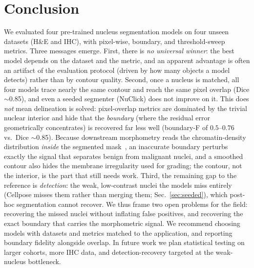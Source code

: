 \documentclass[10pt,conference]{IEEEtran}
\begin{document}
\section{Conclusion}
\label{sec:conclusion}
We evaluated four pre-trained nucleus segmentation models on four unseen datasets (H\&E and IHC),
with pixel-wise, boundary, and threshold-sweep metrics. Three messages emerge.
First, there is \emph{no universal winner}: the best model depends on the dataset and the metric,
and an apparent advantage is often an artifact of the evaluation protocol (driven by how many
objects a model detects) rather than by contour quality.
Second, once a nucleus is matched, all four models trace nearly the same contour and reach the same
pixel overlap (Dice $\sim$0.85), and even a seeded segmenter (NuClick) does not improve on it. This does \emph{not} mean delineation is solved: pixel-overlap metrics are dominated
by the trivial nuclear interior and hide that the \emph{boundary} (where the residual error
geometrically concentrates) is recovered far less well (boundary-F of $0.5$--$0.76$ vs.\ Dice
$\sim$0.85). Because downstream morphometry reads the chromatin-density distribution \emph{inside}
the segmented mask~\cite{shifaterabbi2025}, an inaccurate boundary perturbs exactly the signal that
separates benign from malignant nuclei, and a smoothed contour also hides the membrane irregularity
used for grading; the contour, not the interior, is the part that still needs work.
Third, the remaining gap to the reference is \emph{detection}: the weak, low-contrast nuclei the
models miss entirely (Cellpose misses them rather than merging them; Sec.~\ref{sec:seeded}), which
post-hoc segmentation cannot recover.
We thus frame two open problems for the field: recovering the missed nuclei without inflating false
positives, and recovering the exact boundary that carries the morphometric signal. We recommend
choosing models with datasets and metrics matched to the application, and reporting boundary
fidelity alongside overlap. In future work we plan statistical testing on larger cohorts, more IHC
data, and detection-recovery targeted at the weak-nucleus bottleneck.



\end{document}
